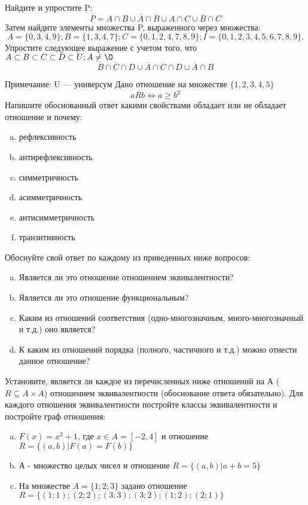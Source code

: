 \documentclass[10pt]{exam}
\begin{document}
\begin{questions}
\question
Найдите и упростите P:
\begin{equation*}
\overline{P} = A \cap B \cup \overline{A} \cap \overline{B} \cup A \cap C \cup \overline{B} \cap C
\end{equation*}
Затем найдите элементы множества P, выраженного через множества:
\begin{equation*}
A = \{0, 3, 4, 9\}; 
B = \{1, 3, 4, 7\};
C = \{0, 1, 2, 4, 7, 8, 9\};
I = \{0, 1, 2, 3, 4, 5, 6, 7, 8, 9\}.
\end{equation*}\question
Упростите следующее выражение с учетом того, что $A\subset B \subset C \subset D \subset U; A \neq \O$
\begin{equation*}
\overline{B} \cap \overline{C} \cap D \cup \overline{A} \cap \overline{C} \cap D \cup \overline{A} \cap B
\end{equation*}

Примечание: U — универсум\question
Дано отношение на множестве $\{1, 2, 3, 4, 5\}$ 
\begin{equation*}
aRb \iff a \geq b^2
\end{equation*}
Напишите обоснованный ответ какими свойствами обладает или не обладает отношение и почему:   
\begin{enumerate} [a)]\setcounter{enumi}{0}
\item рефлексивность
\item антирефлексивность
\item симметричность
\item асимметричность
\item антисимметричность
\item транзитивность
\end{enumerate}

Обоснуйте свой ответ по каждому из приведенных ниже вопросов:
\begin{enumerate} [a)]\setcounter{enumi}{0}
    \item Является ли это отношение отношением эквивалентности?
    \item Является ли это отношение функциональным?
    \item Каким из отношений соответствия (одно-многозначным, много-многозначный и т.д.) оно является?
    \item К каким из отношений порядка (полного, частичного и т.д.) можно отнести данное отношение?
\end{enumerate}


\question
Установите, является ли каждое из перечисленных ниже отношений на А ($R \subseteq A \times A$) отношением эквивалентности (обоснование ответа обязательно). Для каждого отношения эквивалентности постройте классы эквивалентности и постройте граф отношения:
\begin{enumerate} [a)]\setcounter{enumi}{0}
\item $F(x)=x^{2}+1$, где $x \in A = [-2, 4]$ и отношение $R = \{(a,b)|F(a) = F(b)\}$
\item А - множество целых чисел и отношение $R = \{(a,b)|a + b = 5\}$
\item На множестве $A = \{1; 2; 3\}$ задано отношение $R = \{(1; 1); (2; 2); (3; 3); (3; 2); (1; 2); (2; 1)\}$


\end{enumerate}
\end{questions}
\end{document}
